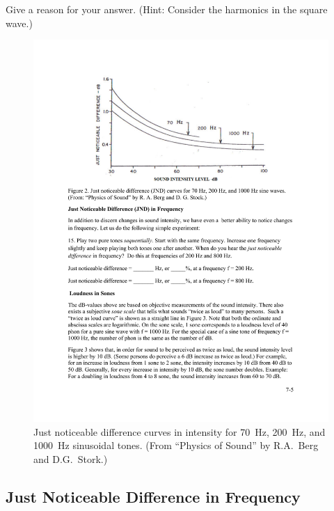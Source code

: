 \documentclass[11pt]{NSF}
\begin{document}
Give a reason for your answer. (Hint: Consider the harmonics in the square wave.)

%
\begin{figure}[hbtp]
\begin{center}
\includegraphics[width=.7\textwidth]{fig7_2}
\caption{Just noticeable difference curves in intensity 
for 70~Hz, 200~Hz, and 1000~Hz sinusoidal tones. 
(From ``Physics of Sound” by R.A.~Berg and D.G.~Stork.)}
\label{f:2}
\end{center}
\end{figure}

\subsection{Just Noticeable Difference in Frequency}
\end{document}
